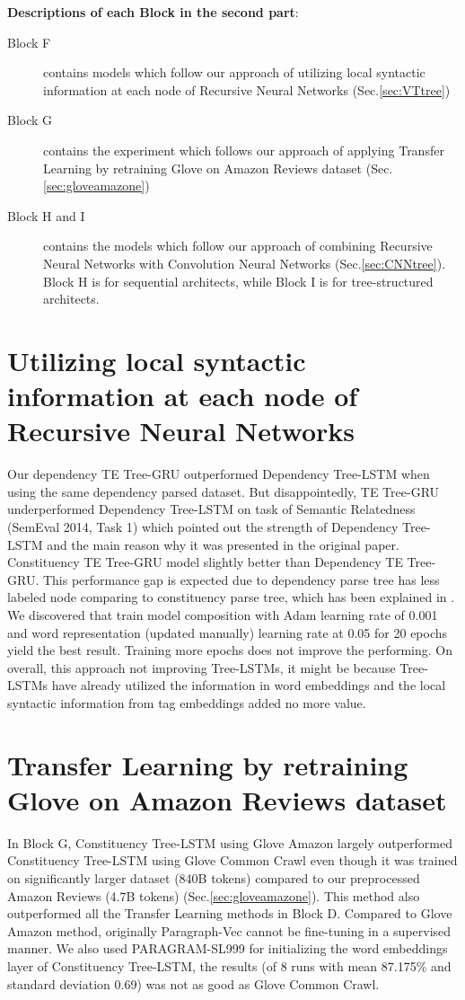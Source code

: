 \textbf{Descriptions of each Block in the second part}:
\begin{description}
\item[Block F] contains models which follow our approach of utilizing local syntactic information at each node of Recursive Neural Networks (Sec.\ref{sec:VTtree})
\item[Block G] contains the experiment which follows our approach of applying Transfer Learning by retraining Glove on Amazon Reviews dataset (Sec.\ref{sec:gloveamazone})
\item[Block H and I] contains the models which follow our approach of combining Recursive Neural Networks with Convolution Neural Networks (Sec.\ref{sec:CNNtree}).
Block H is for sequential architects, while Block I is for tree-structured architects.
\end{description} 

\section{Utilizing local syntactic information at each node of Recursive Neural Networks}
Our dependency TE Tree-GRU outperformed Dependency Tree-LSTM when using the same dependency parsed dataset. 
But disappointedly, TE Tree-GRU underperformed Dependency Tree-LSTM on task of Semantic Relatedness (SemEval 2014, Task 1\cite{SemeEvalTask1}) which pointed out the strength of Dependency Tree-LSTM and the main reason why it was presented in the original paper\cite{treeLSTM}.
Constituency TE Tree-GRU model slightly better than Dependency TE Tree-GRU. 
This performance gap is expected due to dependency parse tree has less labeled node comparing to constituency parse tree, which has been explained in  \cite{treeLSTM}. 
We discovered that train model composition with Adam learning rate of 0.001 and word representation (updated manually) learning rate at 0.05 for 20 epochs yield the best result. 
Training more epochs does not improve the performing.
\label{unproved:tag-useless}
On overall, this approach not improving Tree-LSTMs, it might be because Tree-LSTMs have already utilized the information in word embeddings and the local syntactic information from tag embeddings added no more value.


\section{Transfer Learning by retraining Glove on Amazon Reviews dataset}
\label{fact:glove-amazon-improve-tree}
In Block G, Constituency Tree-LSTM using Glove Amazon largely outperformed Constituency Tree-LSTM using Glove Common Crawl even though it was trained on significantly larger dataset (840B tokens) compared to our preprocessed Amazon Reviews (4.7B tokens) (Sec.\ref{sec:gloveamazone}).
This method also outperformed all the Transfer Learning methods in Block D.
Compared to Glove Amazon method, originally Paragraph-Vec\cite{ParagraphVec} cannot be fine-tuning in a supervised manner.
We also used PARAGRAM-SL999 for initializing the word embeddings layer of Constituency Tree-LSTM,
the results (of 8 runs with mean 87.175\% and standard deviation 0.69) was not as good as Glove Common Crawl. 

